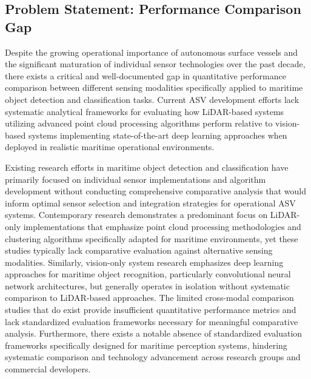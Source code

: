 \documentclass{erauthesis}
\begin{document}
\subsection{Problem Statement: Performance Comparison Gap}

Despite the growing operational importance of autonomous surface vessels and the significant maturation of individual sensor technologies over the past decade, there exists a critical and well-documented gap in quantitative performance comparison between different sensing modalities specifically applied to maritime object detection and classification tasks. Current \ac{ASV} development efforts lack systematic analytical frameworks for evaluating how \ac{LiDAR}-based systems utilizing advanced point cloud processing algorithms perform relative to vision-based systems implementing state-of-the-art deep learning approaches when deployed in realistic maritime operational environments.

Existing research efforts in maritime object detection and classification have primarily focused on individual sensor implementations and algorithm development without conducting comprehensive comparative analysis that would inform optimal sensor selection and integration strategies for operational \ac{ASV} systems. Contemporary research demonstrates a predominant focus on \ac{LiDAR}-only implementations that emphasize point cloud processing methodologies and clustering algorithms specifically adapted for maritime environments, yet these studies typically lack comparative evaluation against alternative sensing modalities. Similarly, vision-only system research emphasizes deep learning approaches for maritime object recognition, particularly convolutional neural network architectures, but generally operates in isolation without systematic comparison to \ac{LiDAR}-based approaches. The limited cross-modal comparison studies that do exist provide insufficient quantitative performance metrics and lack standardized evaluation frameworks necessary for meaningful comparative analysis. Furthermore, there exists a notable absence of standardized evaluation frameworks specifically designed for maritime perception systems, hindering systematic comparison and technology advancement across research groups and commercial developers.
\end{document}
